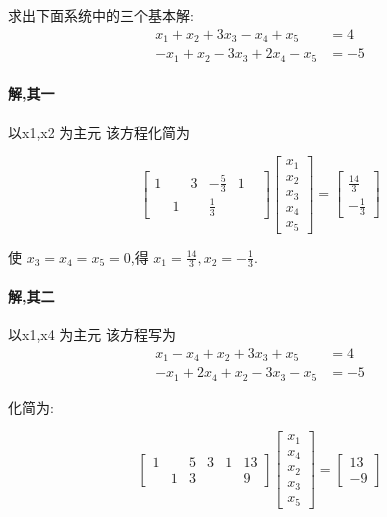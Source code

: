 \documentclass[a4paper]{article}
\begin{document}
\section{}

求出下面系统中的三个基本解:
\[\begin{aligned}
    x_1 + x_2 + 3 x_3 - x_4 + x_5 &= 4\\
    -x_1 + x_2 - 3 x_3+ 2x_4 - x_5 &= -5
\end{aligned}\]

\paragraph{解,其一} 以x1,x2 为主元 该方程化简为

\[
\begin{bmatrix}
1 &   & 3 & -\frac{5}{3} & 1 &  \\
  & 1 &   & \frac{1}{3} &   & 
\end{bmatrix}
\left[\begin{array}{c} x_1 \\ x_2 \\ x_3 \\ x_4 \\x_5 \end{array}\right] =
\left[\begin{array}{c} \frac{14}{3} \\ -\frac{1}{3} \end{array}\right]
\]

使 $x_3= x_4 = x_5 = 0$,得 $x_1 = \frac{14}{3}, x_2 = -\frac{1}{3}$.



\paragraph{解,其二} 以x1,x4 为主元 该方程写为
\[\begin{aligned}
    x_1  - x_4+ x_2 + 3 x_3 + x_5 &= 4\\
    -x_1 + 2x_4 + x_2 - 3 x_3 - x_5 &= -5
\end{aligned}\]

化简为:

\[
\begin{bmatrix}
1 &   & 5 & 3 & 1 & 13 \\
  & 1 & 3 &   &   & 9
\end{bmatrix}
\left[\begin{array}{c} x_1 \\ x_4 \\ x_2 \\ x_3 \\x_5 \end{array}\right] =
\left[\begin{array}{c} 13 \\ -9\end{array}\right]
\]
\end{document}
